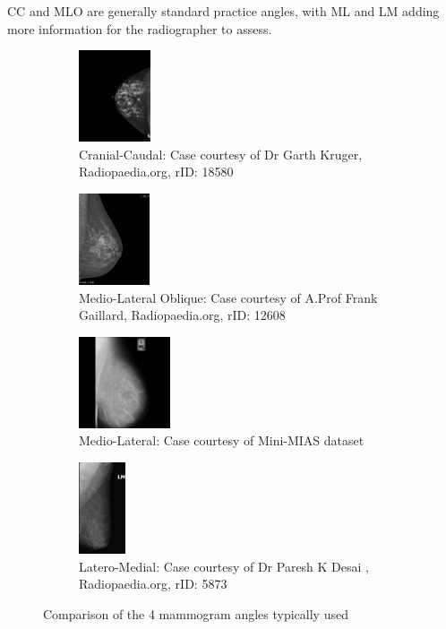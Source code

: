 CC and MLO are generally standard practice angles, with ML and LM adding more information for the radiographer to assess.
\begin{figure}[H]
\begin{center}
  \begin{subfigure}[t]{0.45\textwidth}
    \centering
        \includegraphics[height=2.7cm]{Chapter1/background-img/CC.jpg}
        \caption{Cranial-Caudal: Case courtesy of Dr Garth Kruger, Radiopaedia.org, rID: 18580}
        \label{fig:CC}
    \end{subfigure}
    \hfill
    \begin{subfigure}[t]{0.45\textwidth}
      \centering
          \includegraphics[height=2.7cm]{Chapter1/background-img/MLO.jpg}
          \caption{Medio-Lateral Oblique: Case courtesy of A.Prof Frank Gaillard, Radiopaedia.org, rID: 12608}
          \label{fig:MLO}
    \end{subfigure}
    \hspace*{\fill}


    \begin{subfigure}[t]{0.45\textwidth}
      \centering
          \includegraphics[height=2.7cm]{Chapter1/background-img/ML.jpg}
          \caption{Medio-Lateral: Case courtesy of Mini-MIAS dataset \cite{Suckling_1994}}
          \label{fig:LM}
    \end{subfigure}
    \hfill
    \begin{subfigure}[t]{0.45\textwidth}
      \centering
          \includegraphics[height=2.7cm]{Chapter1/background-img/LM.jpg}
          \caption{Latero-Medial: Case courtesy of Dr Paresh K Desai , Radiopaedia.org, rID: 5873}
          \label{fig:ML}
    \end{subfigure}
    \hspace*{\fill}
  \caption{Comparison of the 4 mammogram angles typically used}
  \label{fig:scan-angles}
\end{center}
\end{figure}

